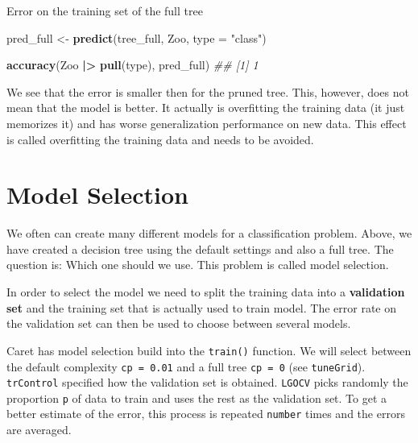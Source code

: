 \documentclass[
  notitlepage]{book}
\newenvironment{Shaded}{\begin{snugshade}}{\end{snugshade}}
\newcommand{\CommentTok}[1]{\textcolor[rgb]{0.56,0.35,0.01}{\textit{#1}}}
\newcommand{\DataTypeTok}[1]{\textcolor[rgb]{0.13,0.29,0.53}{#1}}
\newcommand{\ErrorTok}[1]{\textcolor[rgb]{0.64,0.00,0.00}{\textbf{#1}}}
\newcommand{\KeywordTok}[1]{\textcolor[rgb]{0.13,0.29,0.53}{\textbf{#1}}}
\newcommand{\NormalTok}[1]{#1}
\newcommand{\OperatorTok}[1]{\textcolor[rgb]{0.81,0.36,0.00}{\textbf{#1}}}
\newcommand{\StringTok}[1]{\textcolor[rgb]{0.31,0.60,0.02}{#1}}
\begin{document}
Error on the training set of the full tree

\begin{Shaded}
\begin{Highlighting}[]
\NormalTok{pred\_full \textless{}{-}}\StringTok{ }\KeywordTok{predict}\NormalTok{(tree\_full, Zoo, }\DataTypeTok{type =} \StringTok{"class"}\NormalTok{)}

\KeywordTok{accuracy}\NormalTok{(Zoo }\OperatorTok{|}\ErrorTok{\textgreater{}}\StringTok{ }\KeywordTok{pull}\NormalTok{(type), pred\_full)}
\CommentTok{\#\# [1] 1}
\end{Highlighting}
\end{Shaded}

We see that the error is smaller then for the pruned tree. This,
however, does not mean that the model is better. It actually is overfitting
the training data (it just memorizes it) and has worse generalization
performance on new data. This effect
is called overfitting the training data and needs to be avoided.

\hypertarget{model-selection}{%
\section{Model Selection}\label{model-selection}}

We often can create many different models for a classification problem.
Above, we have created a decision tree using the default settings and also
a full tree. The question is: Which one should we use. This problem is called
model selection.

In order to select the model we need to split the training data into a
\textbf{validation set} and the training set that is actually used to train model.
The error rate on the validation set can then be used to choose
between several models.

Caret has model selection build into the \texttt{train()} function. We will select
between the default complexity \texttt{cp\ =\ 0.01} and a full tree \texttt{cp\ =\ 0} (see \texttt{tuneGrid}).
\texttt{trControl} specified how the validation set is obtained. \texttt{LGOCV}
picks randomly the proportion \texttt{p} of data to train and uses the rest as
the validation set. To get a better estimate of the
error, this process is repeated \texttt{number} times and the errors are averaged.
\end{document}
